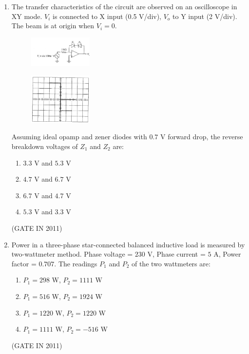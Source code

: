 \documentclass[journal]{IEEEtran}
\begin{document}
\begin{enumerate}
\item The transfer characteristics of the circuit are observed on an oscilloscope in XY mode. $V_i$ is connected to X input (0.5 V/div), $V_o$ to Y input (2 V/div). The beam is at origin when $V_i = 0$. 
\begin{multicols}{2}
\begin{figure}[H]
      \includegraphics[width=0.3\textwidth]{11.png} 
      \caption{}
    \label{fig:fig11} 
\end{figure}
\begin{figure}[H]
      \includegraphics[width=0.3\textwidth]{12.png} 
      \caption{}
    \label{fig:fig12} 
\end{figure}
\end{multicols}
Assuming ideal opamp and zener diodes with $0.7$ V forward drop, the reverse breakdown voltages of $Z_1$ and $Z_2$ are:
\begin{multicols}{4}
\begin{enumerate}
\item $3.3$ V and $5.3$ V  
\item $4.7$ V and $6.7$ V  
\item $6.7$ V and $4.7$ V  
\item $5.3$ V and $3.3$ V
\end{enumerate}
\end{multicols} \hfill(GATE IN 2011)

\item Power in a three-phase star-connected balanced inductive load is measured by two-wattmeter method. Phase voltage = $230$ V, Phase current = $5$ A, Power factor = $0.707$.  
The readings $P_1$ and $P_2$ of the two wattmeters are:
\begin{multicols}{2}
\begin{enumerate}
\item $P_1 = 298$ W, $P_2 = 1111$ W  
\item $P_1 = 516$ W, $P_2 = 1924$ W  
\item $P_1 = 1220$ W, $P_2 = 1220$ W  
\item $P_1 = 1111$ W, $P_2 = -516$ W
\end{enumerate}
\end{multicols} \hfill(GATE IN 2011)


\end{enumerate}
\end{document}
